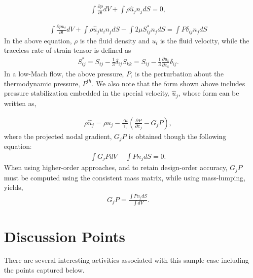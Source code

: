 \documentclass{article}
\begin{document}
\begin{align}
 \int  \frac {\partial \rho }{\partial t} dV + \int \rho \hat{u}_j n_j dS = 0,
\label{eq:contEq}
\end{align} 

\begin{align}
\int  \frac {\partial \rho u_i }{\partial t} dV + \int \rho \hat{u}_j u_i n_j dS 
-\int 2 \mu S^*_{ij} n_j dS = \int P \delta_{ij} n_j dS
\label{eq:momEq}
\end{align}
%
In the above equation, $\rho$ is the fluid density and $u_i$ is the fluid velocity, while
the traceless rate-of-strain tensor is defined as
\begin{align}
S^*_{ij}  = S_{ij} - \frac{1}{3} \delta_{ij} S_{kk} \nonumber
		     = S_{ij} - \frac{1}{3} \frac{\partial  u_k }{\partial x_k}\delta_{ij}.
\end{align}
In a low-Mach flow, the above pressure, $P$, is the perturbation about the thermodynamic
pressure, $P^{th}$. We also note that the form shown above includes pressure stabilization
embedded in the special velocity, $\hat{u}_j$, whose form can be written as,

\begin{align}
\rho \hat{u}_j = \rho u_j -\frac{\Delta t}{\gamma_1}\left(\frac{\partial P}{\partial x_j} - G_j P\right),
\end{align}
where the projected nodal gradient, $G_jP$ is obtained though the following equation:
\begin{align}
\int G_j P dV - \int P n_j dS = 0.
\end{align}
When using higher-order approaches, and to retain design-order accuracy, $G_jP$ must be computed
using the consistent mass matrix, while using mass-lumping, yields,
\begin{align}
G_j P = \frac{\int P n_j dS}{\int dV}.
\end{align}

\section{Discussion Points}

There are several interesting activities associated with this sample case including
the points captured below. 
\end{document}
